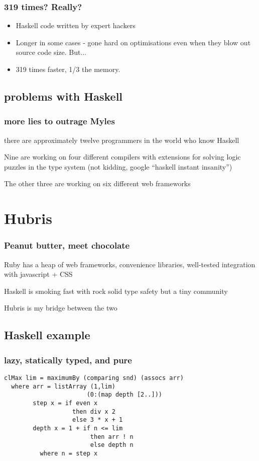 \documentclass{beamer}
\begin{document}
\begin{frame}
  \frametitle{319 times? Really?}
  \begin{itemize}
  \item<1-> Haskell code written by expert hackers
  \item<2-> Longer in some cases - gone hard on optimisations
    even when they blow out source code size. But...
  \item <3-> 319 times faster, 1/3 the memory.
  \end{itemize}
\end{frame}

\subsection{problems with Haskell}
\begin{frame}
\frametitle{more lies to outrage Myles}
\setlength\parskip{0.1in}
there are approximately twelve programmers in the world who know Haskell

Nine are working on four different compilers with extensions for
solving logic puzzles in the type system (not kidding, google
``haskell instant insanity'')

The other three are working on six different web frameworks
\end{frame}

\section{Hubris}
\begin{frame}
\frametitle{Peanut butter, meet chocolate}
Ruby has a heap of web frameworks, convenience libraries, well-tested
integration with javascript + CSS
\setlength\parskip{0.25in}

Haskell is smoking fast with rock solid type safety but a tiny
community

Hubris is my bridge between the two
\end{frame}

\subsection{Haskell example}
\begin{frame}[fragile]
  \frametitle{lazy, statically typed, and pure}
  \begin{lstlisting}
clMax lim = maximumBy (comparing snd) (assocs arr)
  where arr = listArray (1,lim) 
                       (0:(map depth [2..]))
        step x = if even x 
                   then div x 2 
                   else 3 * x + 1
        depth x = 1 + if n <= lim 
                        then arr ! n 
                        else depth n
          where n = step x    
  \end{lstlisting}
\end{frame}
\end{document}
